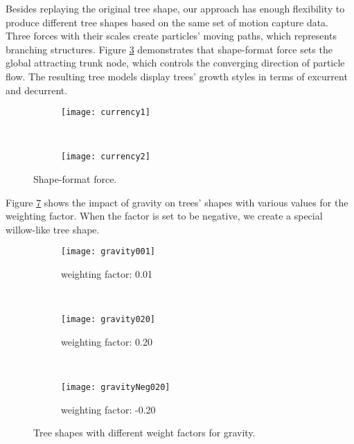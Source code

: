 Besides replaying the original tree shape, our approach has enough flexibility to produce different tree shapes based on the same set of motion capture data. Three forces with their scales create particles' moving paths, which represents branching structures. Figure \ref{fig:currency} demonstrates that shape-format force sets the global attracting trunk node, which controls the converging direction of particle flow. The resulting tree models display trees' growth styles in terms of excurrent and decurrent.

\begin{figure}
\centering
        \begin{subfigure}[b]{0.33\textwidth}
                \centering
                \texttt{[image: currency1]}
                \caption{}
                \label{fig:currency1}
        \end{subfigure}
        ~
        \begin{subfigure}[b]{0.33\textwidth}
                \centering
                \texttt{[image: currency2]}
                \caption{}
                \label{fig:currency2}
        \end{subfigure}
\caption{Shape-format force.}
\label{fig:currency}
\end{figure}

Figure \ref{fig:gravityTree} shows the impact of gravity on trees' shapes with various values for the weighting factor. When the factor is set to be negative, we create a special willow-like tree shape. 

\begin{figure}
\centering
        \begin{subfigure}[b]{0.3\textwidth}
                \centering
                \texttt{[image: gravity001]}
                \caption{weighting factor: 0.01}
                \label{fig:gravity001}
        \end{subfigure}
        ~
        \begin{subfigure}[b]{0.3\textwidth}
                \centering
                \texttt{[image: gravity020]}
                \caption{weighting factor: 0.20}
                \label{fig:gravity020}
        \end{subfigure}
        ~
        \begin{subfigure}[b]{0.3\textwidth}
                \centering
                \texttt{[image: gravityNeg020]}
                \caption{weighting factor: -0.20}
                \label{fig:gravityNeg020}
        \end{subfigure}
\caption{Tree shapes with different weight factors for gravity.}
\label{fig:gravityTree}
\end{figure}

